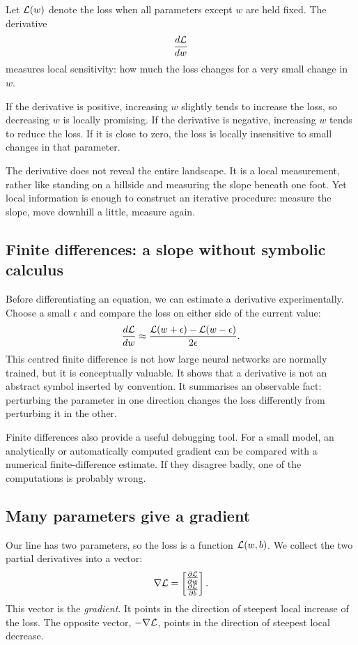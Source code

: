 Let \(\mathcal{L}(w)\) denote the loss when all parameters except \(w\) are held fixed. The derivative
\[
  \frac{d\mathcal{L}}{dw}
\]
measures local sensitivity: how much the loss changes for a very small change in \(w\).

If the derivative is positive, increasing \(w\) slightly tends to increase the loss, so decreasing \(w\) is locally promising. If the derivative is negative, increasing \(w\) tends to reduce the loss. If it is close to zero, the loss is locally insensitive to small changes in that parameter.

The derivative does not reveal the entire landscape. It is a local measurement, rather like standing on a hillside and measuring the slope beneath one foot. Yet local information is enough to construct an iterative procedure: measure the slope, move downhill a little, measure again.

\subsection{Finite differences: a slope without symbolic calculus}

Before differentiating an equation, we can estimate a derivative experimentally. Choose a small \(\epsilon\) and compare the loss on either side of the current value:
\begin{equation}
  \frac{d\mathcal{L}}{dw}
  \approx
  \frac{\mathcal{L}(w+\epsilon)-\mathcal{L}(w-\epsilon)}{2\epsilon}.
  \label{eq:week2-finite-diff}
\end{equation}
This centred finite difference is not how large neural networks are normally trained, but it is conceptually valuable. It shows that a derivative is not an abstract symbol inserted by convention. It summarises an observable fact: perturbing the parameter in one direction changes the loss differently from perturbing it in the other.

Finite differences also provide a useful debugging tool. For a small model, an analytically or automatically computed gradient can be compared with a numerical finite-difference estimate. If they disagree badly, one of the computations is probably wrong.

\subsection{Many parameters give a gradient}

Our line has two parameters, so the loss is a function \(\mathcal{L}(w,b)\). We collect the two partial derivatives into a vector:
\begin{equation}
  \nabla\mathcal{L}
  =
  \begin{bmatrix}
    \frac{\partial \mathcal{L}}{\partial w} \\
    \frac{\partial \mathcal{L}}{\partial b}
  \end{bmatrix}.
  \label{eq:week2-gradient}
\end{equation}
This vector is the \emph{gradient}. It points in the direction of steepest local increase of the loss. The opposite vector, \(-\nabla\mathcal{L}\), points in the direction of steepest local decrease.

